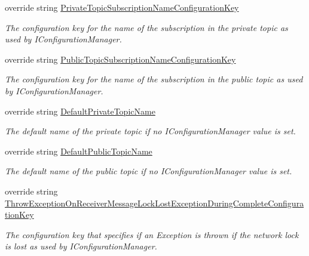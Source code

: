 \begin{DoxyCompactItemize}
override string \hyperlink{classCqrs_1_1Azure_1_1ServiceBus_1_1AzureEventBus_a112106688036d18c72fc02875b1b0a8b_a112106688036d18c72fc02875b1b0a8b}{Private\+Topic\+Subscription\+Name\+Configuration\+Key}
\begin{DoxyCompactList}\small\item\em The configuration key for the name of the subscription in the private topic as used by I\+Configuration\+Manager. \end{DoxyCompactList}\item 
override string \hyperlink{classCqrs_1_1Azure_1_1ServiceBus_1_1AzureEventBus_ad09814d0307b01d36fe981cf4b997e79_ad09814d0307b01d36fe981cf4b997e79}{Public\+Topic\+Subscription\+Name\+Configuration\+Key}
\begin{DoxyCompactList}\small\item\em The configuration key for the name of the subscription in the public topic as used by I\+Configuration\+Manager. \end{DoxyCompactList}\item 
override string \hyperlink{classCqrs_1_1Azure_1_1ServiceBus_1_1AzureEventBus_ad1951d2d7ccbf739e9390437d960b3f5_ad1951d2d7ccbf739e9390437d960b3f5}{Default\+Private\+Topic\+Name}
\begin{DoxyCompactList}\small\item\em The default name of the private topic if no I\+Configuration\+Manager value is set. \end{DoxyCompactList}\item 
override string \hyperlink{classCqrs_1_1Azure_1_1ServiceBus_1_1AzureEventBus_a252a4ac7c235b7fbb44849fbdb08b0eb_a252a4ac7c235b7fbb44849fbdb08b0eb}{Default\+Public\+Topic\+Name}
\begin{DoxyCompactList}\small\item\em The default name of the public topic if no I\+Configuration\+Manager value is set. \end{DoxyCompactList}\item 
override string \hyperlink{classCqrs_1_1Azure_1_1ServiceBus_1_1AzureEventBus_aaf0a0d07f6c5c1940cb633b362aa7177_aaf0a0d07f6c5c1940cb633b362aa7177}{Throw\+Exception\+On\+Receiver\+Message\+Lock\+Lost\+Exception\+During\+Complete\+Configuration\+Key}
\begin{DoxyCompactList}\small\item\em The configuration key that specifies if an Exception is thrown if the network lock is lost as used by I\+Configuration\+Manager. \end{DoxyCompactList}\end{DoxyCompactItemize}
